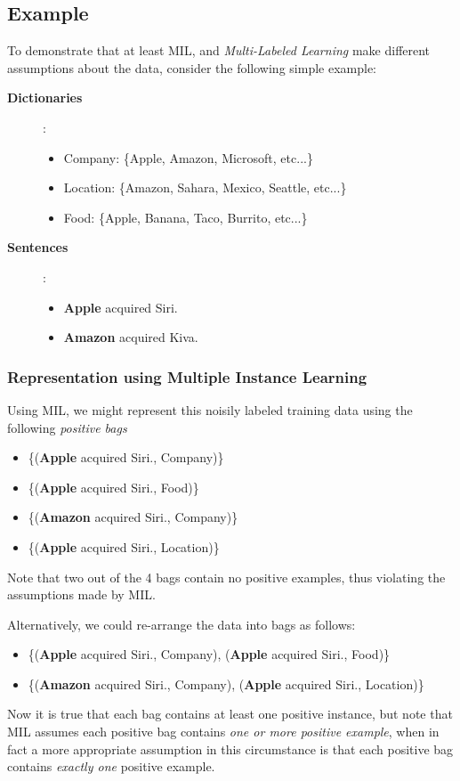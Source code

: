 \documentclass[12pt]{article}
\begin{document}
\subsection{Example}
To demonstrate that at least MIL, and \emph{Multi-Labeled Learning} make different assumptions about the data, consider the following simple example:
\begin{description}
  \item[\bf Dictionaries]:
    \begin{itemize}
      \item {\sc Company}: \{Apple, Amazon, Microsoft, etc...\}
      \item {\sc Location}: \{Amazon, Sahara, Mexico, Seattle, etc...\}
      \item {\sc Food}: \{Apple, Banana, Taco, Burrito, etc...\}
    \end{itemize}
  \item[\bf Sentences]:
    \begin{itemize}
      \item {\bf Apple} acquired Siri.
      \item {\bf Amazon} acquired Kiva.
    \end{itemize}
\end{description}

\subsubsection{Representation using Multiple Instance Learning}
Using MIL, we might represent this noisily labeled training data using the following \emph{positive bags}
\begin{itemize}
  \item \{({\bf Apple} acquired Siri., {\sc Company})\}
  \item \{({\bf Apple} acquired Siri., {\sc Food})\}
  \item \{({\bf Amazon} acquired Siri., {\sc Company})\}
  \item \{({\bf Apple} acquired Siri., {\sc Location})\}
\end{itemize}
Note that two out of the 4 bags contain no positive examples, thus violating the assumptions made by MIL.

Alternatively, we could re-arrange the data into bags as follows:
\begin{itemize}
  \item \{({\bf Apple} acquired Siri., {\sc Company}),
    ({\bf Apple} acquired Siri., {\sc Food})\}
  \item \{({\bf Amazon} acquired Siri., {\sc Company}),
    ({\bf Apple} acquired Siri., {\sc Location})\}
\end{itemize}
Now it is true that each bag contains at least one positive instance, but note that MIL assumes each positive
bag contains \emph{one or more positive example}, when in fact a more appropriate assumption
in this circumstance is that each positive bag contains \emph{exactly one} positive example.
\end{document}
